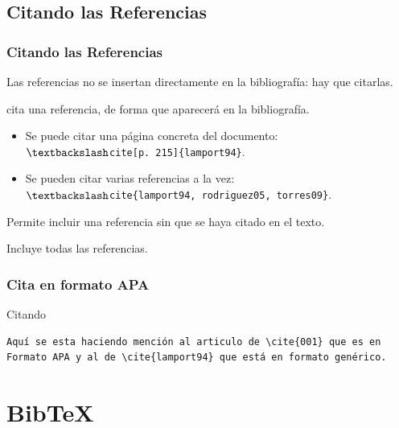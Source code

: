 \documentclass[aspectratio=1610]{beamer}%
\begin{document}
\subsection{Citando las Referencias}
\begin{frame}[fragile]
\frametitle{\textbf{Citando las Referencias}}
\justifying
 Las referencias no se insertan directamente en la bibliografía: hay que citarlas.
 \begin{description}\justifying
  \item[\texttt{$\textbackslash$cite\{label\}}] cita una referencia, de forma que aparecerá en la bibliografía.
  \begin{itemize}\justifying
  \item Se puede citar una página concreta del documento:\\\texttt{$\textbackslash$cite[p. 215]\{lamport94\}}.
  \item Se pueden citar varias referencias a la vez:\\ \texttt{$\textbackslash$cite\{lamport94, rodriguez05, torres09\}}.
\end{itemize}
\item [\texttt{$\textbackslash$nocite\{label\}}] Permite incluir una referencia sin que se haya citado en el texto.
\item [\texttt{$\textbackslash$nocite\{*\}}] Incluye todas las referencias.
\end{description}

\end{frame}


\begin{frame}[fragile]
\frametitle{\textbf{Cita en formato APA}}
\justifying
 \begin{exampleblock}{Citando}
   \vspace{-0.8cm}
\begin{lstlisting}
Aquí se esta haciendo mención al articulo de \cite{001} que es en Formato APA y al de \cite{lamport94} que está en formato genérico.
\end{lstlisting}\vspace{-0.3cm}
\end{exampleblock}


\end{frame}


\section{Bib\TeX{}}
\end{document}
